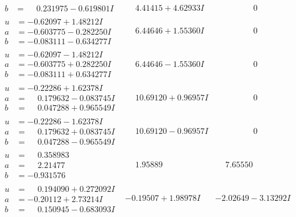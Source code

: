 \documentclass[1p]{elsarticle_modified}
\theoremstyle{definition}
\begin{document}
$$\begin{array}{c|c|c}
\begin{aligned}
b &= \phantom{-}0.231975 - 0.619801 I\end{aligned}
 & \phantom{-}4.41415 + 4.62933 I & \phantom{-0.000000 } 0 \\ \hline\begin{aligned}
u &= -0.62097 + 1.48212 I \\
a &= -0.603775 - 0.282250 I \\
b &= -0.083111 - 0.634277 I\end{aligned}
 & \phantom{-}6.44646 + 1.55360 I & \phantom{-0.000000 } 0 \\ \hline\begin{aligned}
u &= -0.62097 - 1.48212 I \\
a &= -0.603775 + 0.282250 I \\
b &= -0.083111 + 0.634277 I\end{aligned}
 & \phantom{-}6.44646 - 1.55360 I & \phantom{-0.000000 } 0 \\ \hline\begin{aligned}
u &= -0.22286 + 1.62378 I \\
a &= \phantom{-}0.179632 - 0.083745 I \\
b &= \phantom{-}0.047288 + 0.965549 I\end{aligned}
 & \phantom{-}10.69120 + 0.96957 I & \phantom{-0.000000 } 0 \\ \hline\begin{aligned}
u &= -0.22286 - 1.62378 I \\
a &= \phantom{-}0.179632 + 0.083745 I \\
b &= \phantom{-}0.047288 - 0.965549 I\end{aligned}
 & \phantom{-}10.69120 - 0.96957 I & \phantom{-0.000000 } 0 \\ \hline\begin{aligned}
u &= \phantom{-}0.358983\phantom{ +0.000000I} \\
a &= \phantom{-}2.21477\phantom{ +0.000000I} \\
b &= -0.931576\phantom{ +0.000000I}\end{aligned}
 & \phantom{-}1.95889\phantom{ +0.000000I} & \phantom{-}7.65550\phantom{ +0.000000I} \\ \hline\begin{aligned}
u &= \phantom{-}0.194090 + 0.272092 I \\
a &= -0.20112 + 2.73214 I \\
b &= \phantom{-}0.150945 - 0.683093 I\end{aligned}
 & -0.19507 + 1.98978 I & -2.02649 - 3.13292 I \\ \hline\begin{aligned}

\end{aligned}
\end{array}$$
\end{document}
